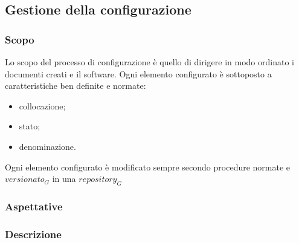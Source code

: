 \subsection{Gestione della configurazione}\label{3.2}

\subsubsection{Scopo}\label{3.2.1}
Lo scopo del processo di configurazione è quello di dirigere in modo ordinato i documenti creati e il software. Ogni elemento configurato è sottoposto a caratteristiche ben definite e normate:
\begin{itemize}
 \item collocazione;
 \item stato;
 \item denominazione.
\end{itemize}
Ogni elemento configurato è modificato sempre secondo procedure normate e $versionato_G$ in una $repository_G$

\subsubsection{Aspettative}

\subsubsection{Descrizione}

